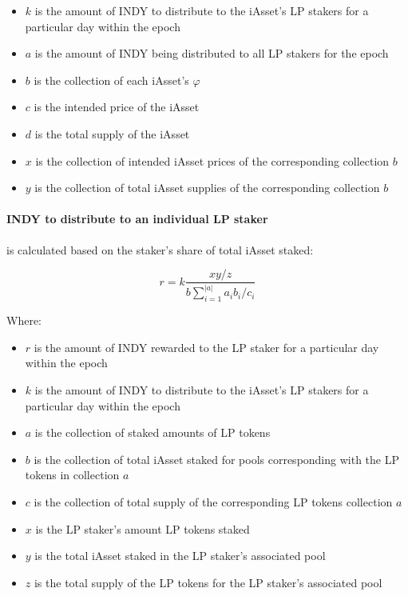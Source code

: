 \documentclass{article}
\begin{document}
\begin{sloppypar}
\begin{itemize}
\item
  \(k\) is the amount of INDY to distribute to the iAsset's LP stakers
  for a particular day within the epoch
\item
  \(a\) is the amount of INDY being distributed to all LP stakers for
  the epoch
\item
  \(b\) is the collection of each iAsset's \(\varphi\)
\item
  \(c\) is the intended price of the iAsset
\item
  \(d\) is the total supply of the iAsset
\item
  \(x\) is the collection of intended iAsset prices of the corresponding
  collection \(b\)
\item
  \(y\) is the collection of total iAsset supplies of the corresponding
  collection \(b\)
\end{itemize}

\hypertarget{indy-to-distribute-to-an-individual-lp-staker}{%
\paragraph{INDY to distribute to an individual LP
staker}\label{indy-to-distribute-to-an-individual-lp-staker}}

is calculated based on the staker's share of total iAsset staked:

\[r=k\frac{xy/z}{b\sum_{i=1}^{\left| a \right|}a_{i}b_{i}/c_{i}}\]

Where:

\begin{itemize}
\item
  \(r\) is the amount of INDY rewarded to the LP staker for a particular
  day within the epoch
\item
  \(k\) is the amount of INDY to distribute to the iAsset's LP stakers
  for a particular day within the epoch
\item
  \(a\) is the collection of staked amounts of LP tokens
\item
  \(b\) is the collection of total iAsset staked for pools corresponding
  with the LP tokens in collection \(a\)
\item
  \(c\) is the collection of total supply of the corresponding LP tokens
  collection \(a\)
\item
  \(x\) is the LP staker's amount LP tokens staked
\item
  \(y\) is the total iAsset staked in the LP staker's associated pool
\item
  \(z\) is the total supply of the LP tokens for the LP staker's
  associated pool
\end{itemize}


\end{sloppypar}
\end{document}
